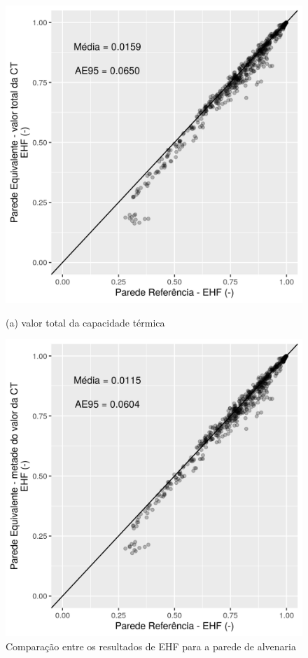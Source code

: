\documentclass[brazil,hardcopy,openany]{ufscthesis} %
\begin{document}
\begin{figure}[h]
	\caption{Comparação entre os resultados de EHF para a parede de alvenaria}
	\begin{minipage}{.5\textwidth}
		\includegraphics[width=\linewidth]{img/paredeeq_EHF_par2a_scatter.png}
		\begin{center}
			\small{(a) valor total da capacidade térmica}
		\end{center}
	\end{minipage}%
	\begin{minipage}{.5\textwidth}
		\includegraphics[width=\linewidth]{img/paredeeq_EHF_par2b_scatter.png}

\end{minipage}
\end{figure}
\end{document}
